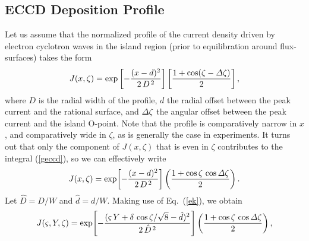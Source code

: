 \documentclass{iopjournal}
\begin{document}
{\subsection{ECCD Deposition Profile}
 Let us assume that the normalized profile of the current density driven by electron cyclotron waves in the island region (prior
 to equilibration around flux-surfaces) takes the form
 \begin{equation}
 J(x,\zeta) = \exp\left[-\frac{(x-d)^2}{2\,D^{\,2}}\right]\left[\frac{1+\cos(\zeta-{\mit\Delta}\zeta)}{2}\right],
 \end{equation}
 where $D$ is the radial width of the profile, $d$  the radial offset between the peak current and the rational surface, and
${\mit\Delta}\zeta$ the angular offset between the peak current and the island O-point. Note that the profile is  comparatively narrow in $x$, and comparatively
wide in $\zeta$, as is  generally the case in experiments. It turns out that  only the component of $J(x,\zeta)$ that is even in $\zeta$ contributes to the integral (\ref{geccd}), so we can effectively write
\begin{equation}
J(x,\zeta)= \exp\!\left[-\frac{(x-d)^2}{2\,D^{\,2}}\right]\left(\frac{1+\cos\zeta\,\cos{\mit\Delta}\zeta}{2}\right).
\end{equation}
Let $\hat{D}=D/W$ and $\hat{d}=d/W$. Making use of Eq.~(\ref{ek}), we obtain 
\begin{equation}
J(\varsigma,Y,\zeta) =  \exp\!\left[-\frac{(\varsigma\,Y+\delta\,\cos\zeta/\sqrt{8}-\hat{d})^2}{2\,\hat{D}^{\,2}}\right]\left(\frac{1+\cos\zeta\,\cos{\mit\Delta}\zeta}{2}\right),
\end{equation}

}
\end{document}
